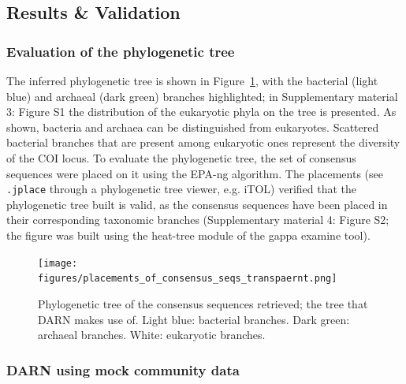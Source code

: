   \subsection{Results \& Validation}
   \label{darn-results}
   \subsubsection*{Evaluation of the phylogenetic tree}
   \label{darn-results-tree-evaluation}

   The inferred phylogenetic tree is shown in Figure~\ref{fig:darn-ref-placements}, with the bacterial (light blue) and archaeal (dark green) branches highlighted;
   in Supplementary material 3: Figure S1 the distribution of the eukaryotic phyla on the tree is presented. 
   As shown, bacteria and archaea can be distinguished from eukaryotes. 
   Scattered bacterial branches that are present among eukaryotic ones represent the diversity of the COI locus. 
   To evaluate the phylogenetic tree, the set of consensus sequences were placed on it using the EPA-ng algorithm. 
   The placements (see \texttt{.jplace} through a phylogenetic tree viewer, e.g. iTOL) verified that the phylogenetic tree built is valid, as the consensus sequences have been placed in their corresponding taxonomic branches (Supplementary material 4: Figure S2; the figure was built using the heat-tree module of the gappa examine tool).

   \begin{figure}[h]
      \centering
      \texttt{[image: figures/placements\_of\_consensus\_seqs\_transpaernt.png]}
      \caption[Placements of the consensus COI sequences on the reference COI tree]{
         Phylogenetic tree of the consensus sequences retrieved; the tree that DARN makes use of. Light blue: bacterial branches. 
         Dark green: archaeal branches. White: eukaryotic branches.
      }
      \label{fig:darn-ref-placements}
   \end{figure}


   \newpage

   \subsubsection*{DARN using mock community data}

